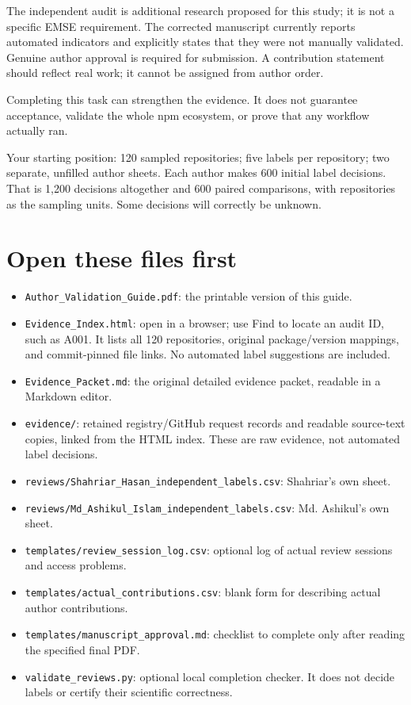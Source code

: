 \documentclass[11pt,a4paper]{article}
\begin{document}
The independent audit is additional research proposed for this study; it is not a specific EMSE requirement. The corrected manuscript currently reports automated indicators and explicitly states that they were not manually validated. Genuine author approval is required for submission. A contribution statement should reflect real work; it cannot be assigned from author order.


Completing this task can strengthen the evidence. It does not guarantee acceptance, validate the whole npm ecosystem, or prove that any workflow actually ran.


Your starting position: 120 sampled repositories; five labels per repository; two separate, unfilled author sheets. Each author makes 600 initial label decisions. That is 1,200 decisions altogether and 600 paired comparisons, with repositories as the sampling units. Some decisions will correctly be unknown.


\section{Open these files first}


\begin{itemize}
\item \nolinkurl{Author_Validation_Guide.pdf}: the printable version of this guide.
\item \nolinkurl{Evidence_Index.html}: open in a browser; use Find to locate an audit ID, such as A001. It lists all 120 repositories, original package/version mappings, and commit-pinned file links. No automated label suggestions are included.
\item \nolinkurl{Evidence_Packet.md}: the original detailed evidence packet, readable in a Markdown editor.
\item \nolinkurl{evidence/}: retained registry/GitHub request records and readable source-text copies, linked from the HTML index. These are raw evidence, not automated label decisions.
\item \nolinkurl{reviews/Shahriar_Hasan_independent_labels.csv}: Shahriar's own sheet.
\item \nolinkurl{reviews/Md_Ashikul_Islam_independent_labels.csv}: Md. Ashikul's own sheet.
\item \nolinkurl{templates/review_session_log.csv}: optional log of actual review sessions and access problems.
\item \nolinkurl{templates/actual_contributions.csv}: blank form for describing actual author contributions.
\item \nolinkurl{templates/manuscript_approval.md}: checklist to complete only after reading the specified final PDF.
\item \nolinkurl{validate_reviews.py}: optional local completion checker. It does not decide labels or certify their scientific correctness.
\end{itemize}
\end{document}
